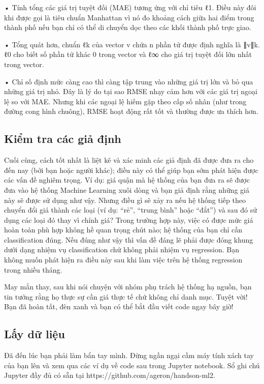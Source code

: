 • Tính tổng các giá trị tuyệt đối (MAE) tương ứng với chỉ tiêu ℓ1. Điều này đôi khi được gọi là tiêu chuẩn Manhattan vì nó đo khoảng cách giữa hai điểm trong thành phố nếu bạn chỉ có thể di chuyển dọc theo các khối thành phố trực giao.

• Tổng quát hơn, chuẩn ℓk của vector v chứa n phần tử được định nghĩa là ∥v∥k. ℓ0 cho biết số phần tử khác 0 trong vector và ℓ∞ cho giá trị tuyệt đối lớn nhất trong vector.

• Chỉ số định mức càng cao thì càng tập trung vào những giá trị lớn và bỏ qua những giá trị nhỏ. Đây là lý do tại sao RMSE nhạy cảm hơn với các giá trị ngoại lệ so với MAE. Nhưng khi các ngoại lệ hiếm gặp theo cấp số nhân (như trong đường cong hình chuông), RMSE hoạt động rất tốt và thường được ưa thích hơn.

\subsection{Kiểm tra các giả định}

Cuối cùng, cách tốt nhất là liệt kê và xác minh các giả định đã được đưa ra cho đến nay (bởi bạn hoặc người khác); điều này có thể giúp bạn sớm phát hiện được các vấn đề nghiêm trọng. Ví dụ: giá quận mà hệ thống của bạn đưa ra sẽ được đưa vào hệ thống Machine Learning xuôi dòng và bạn giả định rằng những giá này sẽ được sử dụng như vậy. Nhưng điều gì sẽ xảy ra nếu hệ thống tiếp theo chuyển đổi giá thành các loại (ví dụ: “rẻ”, “trung bình” hoặc “đắt”) và sau đó sử dụng các loại đó thay vì chính giá? Trong trường hợp này, việc có được mức giá hoàn toàn phù hợp không hề quan trọng chút nào; hệ thống của bạn chỉ cần classification đúng. Nếu đúng như vậy thì vấn đề đáng lẽ phải được đóng khung dưới dạng nhiệm vụ classification chứ không phải nhiệm vụ regression. Bạn không muốn phát hiện ra điều này sau khi làm việc trên hệ thống regression trong nhiều tháng.

May mắn thay, sau khi nói chuyện với nhóm phụ trách hệ thống hạ nguồn, bạn tin tưởng rằng họ thực sự cần giá thực tế chứ không chỉ danh mục. Tuyệt vời! Bạn đã hoàn tất, đèn xanh và bạn có thể bắt đầu viết code ngay bây giờ!

\subsection{Lấy dữ liệu}

Đã đến lúc bạn phải làm bẩn tay mình. Đừng ngần ngại cầm máy tính xách tay của bạn lên và xem qua các ví dụ về code sau trong Jupyter notebook. Sổ ghi chú Jupyter đầy đủ có sẵn tại https://github.com/ageron/handson-ml2.

